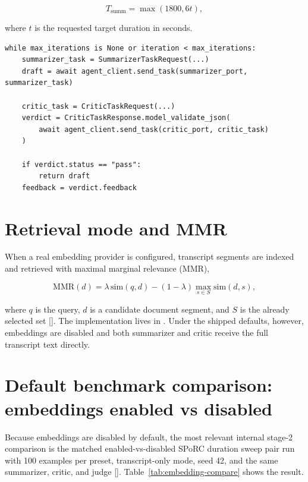 \begin{equation}
T_{\mathrm{summ}} = \max(1800, 6t),
\end{equation}

where \(t\) is the requested target duration in seconds.

\begin{lstlisting}[style=cfpython,caption={Condensed stage-2 loop adapted from \codepath{src/card_framework/runtime/loop_orchestrator.py}.},label={lst:stage2loop}]
while max_iterations is None or iteration < max_iterations:
    summarizer_task = SummarizerTaskRequest(...)
    draft = await agent_client.send_task(summarizer_port, summarizer_task)

    critic_task = CriticTaskRequest(...)
    verdict = CriticTaskResponse.model_validate_json(
        await agent_client.send_task(critic_port, critic_task)
    )

    if verdict.status == "pass":
        return draft
    feedback = verdict.feedback
\end{lstlisting}

\section{Retrieval mode and MMR}

When a real embedding provider is configured, transcript segments are indexed and retrieved with maximal marginal relevance (MMR),

\begin{equation}
\mathrm{MMR}(d) = \lambda \, \mathrm{sim}(q,d) - (1-\lambda)\max_{s \in S}\mathrm{sim}(d,s),
\end{equation}

where \(q\) is the query, \(d\) is a candidate document segment, and \(S\) is the already selected set [\cite{carbonell1998mmr}]. The implementation lives in . Under the shipped defaults, however, embeddings are disabled and both summarizer and critic receive the full transcript text directly.

\section{Default benchmark comparison: embeddings enabled vs disabled}

Because embeddings are disabled by default, the most relevant internal stage-2 comparison is the matched enabled-vs-disabled SPoRC duration sweep pair run with 100 examples per preset, transcript-only mode, seed 42, and the same  summarizer, critic, and judge [\cite{internal_sporc_duration_sweep_enabled_20260319,internal_sporc_duration_sweep_20260320}]. Table~\ref{tab:embedding-compare} shows the result.

